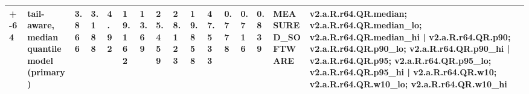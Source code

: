 \begin{table}[t]
\begin{tabular}{llllllllllllllll}
+-64 & tail-aware, median quantile model (primary) & 3.866 & 3.188 & 4.92 & 19.162 & 13.69 & 25.459 & 28.123 & 19.858 & 47.533 & 0.778 & 0.716 & 0.839 & MEASURED\_SOFTWARE & v2.a.R.r64.QR.median; v2.a.R.r64.QR.median\_lo; v2.a.R.r64.QR.median\_hi | v2.a.R.r64.QR.p90; v2.a.R.r64.QR.p90\_lo; v2.a.R.r64.QR.p90\_hi | v2.a.R.r64.QR.p95; v2.a.R.r64.QR.p95\_lo; v2.a.R.r64.QR.p95\_hi | v2.a.R.r64.QR.w10; v2.a.R.r64.QR.w10\_lo; v2.a.R.r64.QR.w10\_hi \\
\bottomrule
\end{tabular}
\end{table}
